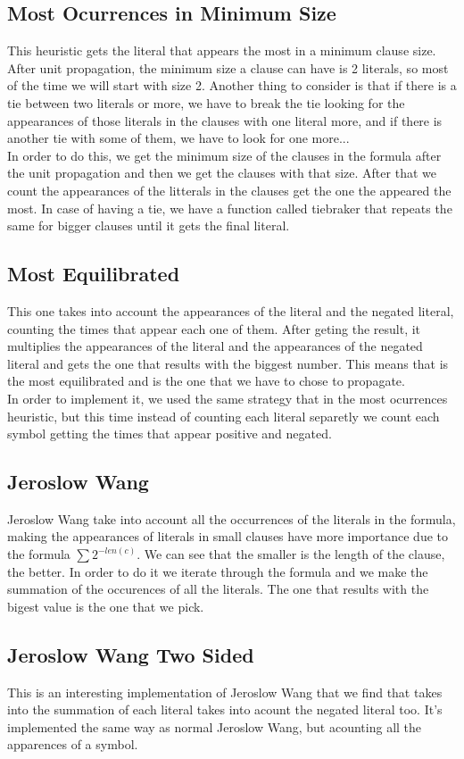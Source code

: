 \documentclass{article}
\begin{document}
\subsection{Most Ocurrences in Minimum Size}
This heuristic gets the literal that appears the most in a minimum clause size. After unit propagation, the minimum size a clause can have is 2 literals, so most of the time we will start with size 2. Another thing to consider is that if there is a tie between two literals or more, we have to break the tie looking for the appearances of those literals in the clauses with one literal more, and if there is another tie with some of them, we have to look for one more...\\
In order to do this, we get the minimum size of the clauses in the formula after the unit propagation and then we get the clauses with that size. After that we count the appearances of the litterals in the clauses get the one the appeared the most. In case of having a tie, we have a function called tiebraker that repeats the same for bigger clauses until it gets the final literal.
\subsection{Most Equilibrated}
This one takes into account the appearances of the literal and the negated literal, counting the times that appear each one of them. After geting the result, it multiplies the appearances of the literal and the appearances of the negated literal and gets the one that results with the biggest number. This means that is the most equilibrated and is the one that we have to chose to propagate.\\
In order to implement it, we used the same strategy that in the most ocurrences heuristic, but this time  instead of counting each literal separetly we count each symbol getting the times that appear positive and negated.
\subsection{Jeroslow Wang}
%
Jeroslow Wang take into account all the occurrences of the literals in the formula, making the appearances of literals in small clauses have more importance due to the formula  $\sum 2^{-len(c)}$. We can see that the smaller is the length of the clause, the better.
In order to do it we iterate through the formula and we make the summation of the occurences of all the literals. The one that results with the bigest value is the one that we pick. 
\subsection{Jeroslow Wang Two Sided}
%
This is an interesting implementation of Jeroslow Wang that we find that takes into the summation of each literal takes into acount the negated literal too. It's implemented the same way as normal Jeroslow Wang, but acounting all the apparences of a symbol.
\end{document}
